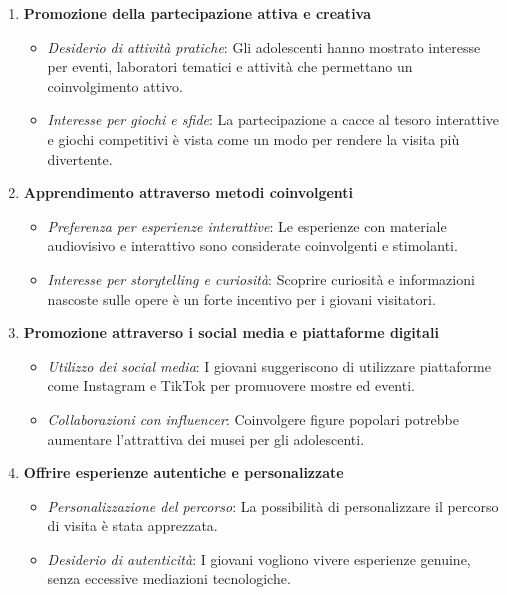 \documentclass{article}
\begin{document}
\begin{enumerate}
    \item \textbf{Promozione della partecipazione attiva e creativa}
        \begin{itemize}
            \item \textit{Desiderio di attività pratiche}: Gli adolescenti hanno mostrato interesse per eventi, laboratori tematici e attività che permettano un coinvolgimento attivo.
            \item \textit{Interesse per giochi e sfide}: La partecipazione a cacce al tesoro interattive e giochi competitivi è vista come un modo per rendere la visita più divertente.
        \end{itemize}

    \item \textbf{Apprendimento attraverso metodi coinvolgenti}
        \begin{itemize}
            \item \textit{Preferenza per esperienze interattive}: Le esperienze con materiale audiovisivo e interattivo sono considerate coinvolgenti e stimolanti.
            \item \textit{Interesse per storytelling e curiosità}: Scoprire curiosità e informazioni nascoste sulle opere è un forte incentivo per i giovani visitatori.
        \end{itemize}

    \item \textbf{Promozione attraverso i social media e piattaforme digitali}
        \begin{itemize}
            \item \textit{Utilizzo dei social media}: I giovani suggeriscono di utilizzare piattaforme come Instagram e TikTok per promuovere mostre ed eventi.
            \item \textit{Collaborazioni con influencer}: Coinvolgere figure popolari potrebbe aumentare l'attrattiva dei musei per gli adolescenti.
        \end{itemize}

    \item \textbf{Offrire esperienze autentiche e personalizzate}
        \begin{itemize}
            \item \textit{Personalizzazione del percorso}: La possibilità di personalizzare il percorso di visita è stata apprezzata.
            \item \textit{Desiderio di autenticità}: I giovani vogliono vivere esperienze genuine, senza eccessive mediazioni tecnologiche.
        \end{itemize}


\end{enumerate}
\end{document}
